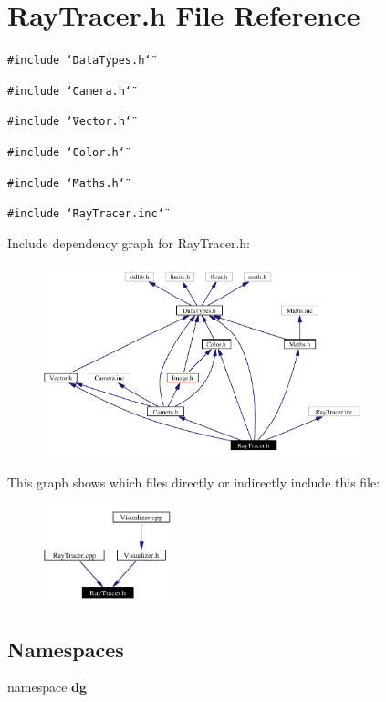 \section{Ray\-Tracer.h File Reference}
\label{RayTracer_8h}
{\tt \#include \char`\"{}Data\-Types.h\char`\"{}}\par
{\tt \#include \char`\"{}Camera.h\char`\"{}}\par
{\tt \#include \char`\"{}Vector.h\char`\"{}}\par
{\tt \#include \char`\"{}Color.h\char`\"{}}\par
{\tt \#include \char`\"{}Maths.h\char`\"{}}\par
{\tt \#include \char`\"{}Ray\-Tracer.inc\char`\"{}}\par


Include dependency graph for Ray\-Tracer.h:\begin{figure}[H]
\begin{center}
\leavevmode
\includegraphics[width=260pt]{RayTracer_8h__incl}
\end{center}
\end{figure}


This graph shows which files directly or indirectly include this file:\begin{figure}[H]
\begin{center}
\leavevmode
\includegraphics[width=104pt]{RayTracer_8h__dep__incl}
\end{center}
\end{figure}
\subsection*{Namespaces}
\begin{CompactItemize}
\item 
namespace {\bf dg}
\end{CompactItemize}
